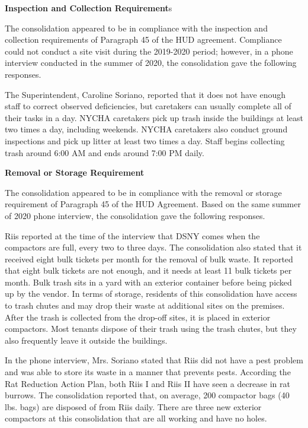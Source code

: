 
\textbf{Inspection and Collection Requirement}s

The consolidation appeared to be in compliance with the inspection and collection requirements of Paragraph 45 of the HUD agreement. Compliance could not conduct a site visit during the 2019-2020 period; however, in a phone interview conducted in the summer of 2020, the consolidation gave the following responses. 

The Superintendent, Caroline Soriano, reported that it does not have enough staff to correct observed deficiencies, but caretakers can usually complete all of their tasks in a day. NYCHA caretakers pick up trash inside the buildings at least two times a day, including weekends. NYCHA caretakers also conduct ground inspections and pick up litter at least two times a day. Staff begins collecting trash around 6:00 AM and ends around 7:00 PM daily.

\textbf{Removal or Storage Requirement}

The consolidation appeared to be in compliance with the removal or storage requirement of Paragraph  45 of the HUD  Agreement.  Based on the same summer of 2020 phone interview, the consolidation gave the following responses.  



Riis reported at the time of the interview that DSNY comes when the compactors are full, every two to three days. The consolidation also stated that it received eight bulk tickets per month for the removal of bulk waste. It reported that eight bulk tickets are not enough, and it needs at least 11 bulk tickets per month.  Bulk trash sits in a yard with an exterior container before being picked up by the vendor. In terms of storage, residents of this consolidation have access to trash chutes and may drop their waste at additional sites on the premises. After the trash is collected from the drop-off sites, it is placed in exterior compactors. Most tenants dispose of their trash using the trash chutes, but they also frequently leave it outside the buildings.  



In the phone interview, Mrs. Soriano stated that Riis did not have a pest problem and was able to store its waste in a manner that prevents pests. According  the Rat Reduction  Action  Plan, both Riis I and Riis II  have seen a decrease in rat burrows. The consolidation reported that, on average, 200 compactor bags (40 lbs. bags) are disposed of from Riis daily. There are three new exterior compactors at this consolidation that are all working and have no holes. 

